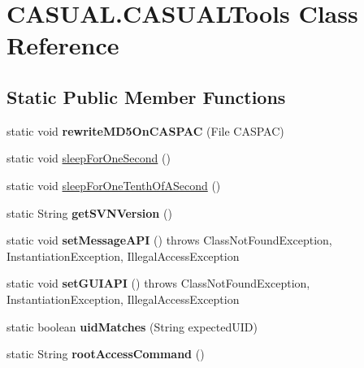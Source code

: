 \hypertarget{classCASUAL_1_1CASUALTools}{\section{C\-A\-S\-U\-A\-L.\-C\-A\-S\-U\-A\-L\-Tools Class Reference}
\label{classCASUAL_1_1CASUALTools}
}
\subsection*{Static Public Member Functions}
\begin{DoxyCompactItemize}
\item 
\hypertarget{classCASUAL_1_1CASUALTools_acd6fb8c7fb16f067e2c923ddfc64ee3f}{static void {\bfseries rewrite\-M\-D5\-On\-C\-A\-S\-P\-A\-C} (File C\-A\-S\-P\-A\-C)}\label{classCASUAL_1_1CASUALTools_acd6fb8c7fb16f067e2c923ddfc64ee3f}

\item 
static void \hyperlink{classCASUAL_1_1CASUALTools_a2ee2f2b4ca75ee7da51a3a77b6c522e9}{sleep\-For\-One\-Second} ()
\item 
static void \hyperlink{classCASUAL_1_1CASUALTools_a4859317e1627454b077010e71ea286c8}{sleep\-For\-One\-Tenth\-Of\-A\-Second} ()
\item 
\hypertarget{classCASUAL_1_1CASUALTools_a33033625f53c1d0db1e7047bfdce76b6}{static String {\bfseries get\-S\-V\-N\-Version} ()}\label{classCASUAL_1_1CASUALTools_a33033625f53c1d0db1e7047bfdce76b6}

\item 
\hypertarget{classCASUAL_1_1CASUALTools_a0a1a819936b265c75cf618414d576808}{static void {\bfseries set\-Message\-A\-P\-I} ()  throws Class\-Not\-Found\-Exception, Instantiation\-Exception, Illegal\-Access\-Exception }\label{classCASUAL_1_1CASUALTools_a0a1a819936b265c75cf618414d576808}

\item 
\hypertarget{classCASUAL_1_1CASUALTools_a3d11cab02790b7080883bde3748f8d59}{static void {\bfseries set\-G\-U\-I\-A\-P\-I} ()  throws Class\-Not\-Found\-Exception, Instantiation\-Exception, Illegal\-Access\-Exception }\label{classCASUAL_1_1CASUALTools_a3d11cab02790b7080883bde3748f8d59}

\item 
\hypertarget{classCASUAL_1_1CASUALTools_a26c406b7342f31a5105734b8baefb967}{static boolean {\bfseries uid\-Matches} (String expected\-U\-I\-D)}\label{classCASUAL_1_1CASUALTools_a26c406b7342f31a5105734b8baefb967}

\item 
\hypertarget{classCASUAL_1_1CASUALTools_ab2aee8f6d7e5630033b1fac1328b9555}{static String {\bfseries root\-Access\-Command} ()}\label{classCASUAL_1_1CASUALTools_ab2aee8f6d7e5630033b1fac1328b9555}

\end{DoxyCompactItemize}
